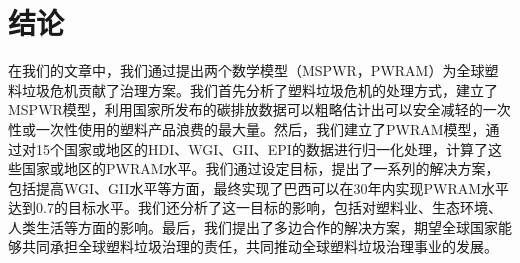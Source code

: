 \documentclass[UTF8, fontset=windows]{mcmthesis}
\begin{document}
\section{结论}

在我们的文章中，我们通过提出两个数学模型（MSPWR，PWRAM）为全球塑料垃圾危机贡献了治理方案。我们首先分析了塑料垃圾危机的处理方式，建立了MSPWR模型，利用国家所发布的碳排放数据可以粗略估计出可以安全减轻的一次性或一次性使用的塑料产品浪费的最大量。然后，我们建立了PWRAM模型，通过对15个国家或地区的HDI、WGI、GII、EPI的数据进行归一化处理，计算了这些国家或地区的PWRAM水平。我们通过设定目标，提出了一系列的解决方案，包括提高WGI、GII水平等方面，最终实现了巴西可以在30年内实现PWRAM水平达到0.7的目标水平。我们还分析了这一目标的影响，包括对塑料业、生态环境、人类生活等方面的影响。最后，我们提出了多边合作的解决方案，期望全球国家能够共同承担全球塑料垃圾治理的责任，共同推动全球塑料垃圾治理事业的发展。



\newpage
\end{document}
